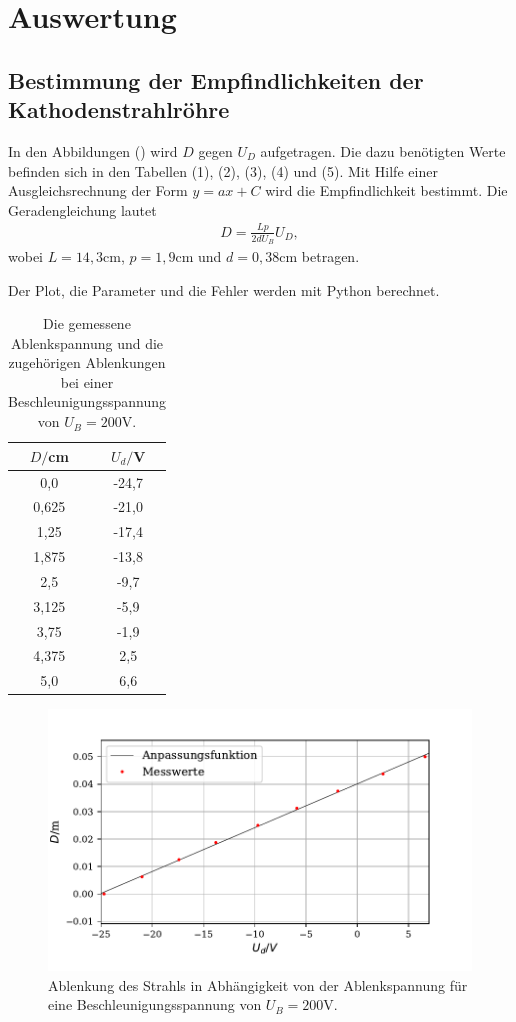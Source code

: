 \section{Auswertung}
\label{sec:Auswertung}
\subsection{Bestimmung der Empfindlichkeiten der Kathodenstrahlröhre}

In den Abbildungen () wird $D$ gegen $U_D$ aufgetragen. Die dazu benötigten Werte befinden sich in den Tabellen (1), (2), (3), (4) und (5).
Mit Hilfe einer Ausgleichsrechnung der Form $y = ax + C$ wird die Empfindlichkeit bestimmt.
Die Geradengleichung lautet
\begin{align*}
D = \frac{Lp}{2dU_B}U_D ,
\end{align*}
wobei $L = 14,3 \si{\cm}$, $p = 1,9 \si{\cm} $ und $d = 0,38 \si{\cm}$ betragen.

\noindent Der Plot, die Parameter und die Fehler werden mit Python berechnet.

\begin{table}[H]
  \centering
  \caption{Die gemessene Ablenkspannung und die zugehörigen Ablenkungen bei einer Beschleunigungsspannung von $U_B = 200 \si{\volt}$.}
  \label{tab:Parameter}
  \begin{tabular}{c c}
    \toprule
    $D/$cm& $U_d/$V \\
    \bottomrule
    0,0 & -24,7 \\
     0,625 & -21,0  \\
     1,25 & -17,4 \\
     1,875 & -13,8  \\
     2,5 & -9,7 \\
     3,125 & -5,9  \\
     3,75& -1,9  \\
     4,375 & 2,5  \\
     5,0 &  6,6 \\
     \bottomrule
  \end{tabular}
\end{table}

\begin{figure}[H]
  \centering
  \includegraphics{plot3.pdf}
  \caption{Ablenkung des Strahls in Abhängigkeit von der Ablenkspannung für eine Beschleunigungsspannung von $U_B = 200 \si{\volt}$. }
  \label{fig:plot}
\end{figure}

